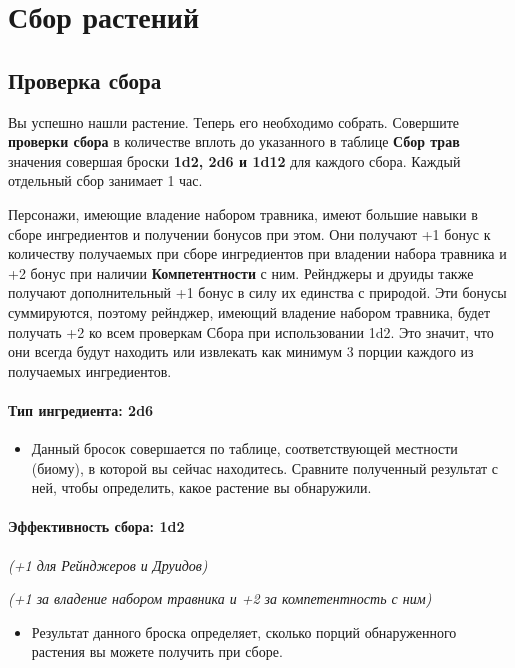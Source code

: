 \documentclass[a4paper, 9pt, twocolumn]{book}
\begin{document}
	\section{Сбор растений}
	
	\subsection{Проверка сбора}
	
	Вы успешно нашли растение. Теперь его необходимо собрать. Совершите \textbf{проверки сбора} в количестве вплоть до указанного в таблице \textbf{Сбор трав} значения совершая броски \textbf{1d2, 2d6 и 1d12} для каждого сбора. Каждый отдельный сбор занимает 1 час.
	
	Персонажи, имеющие владение набором травника, имеют большие навыки в сборе ингредиентов и получении бонусов при этом. Они получают +1 бонус к количеству получаемых при сборе ингредиентов при владении набора травника и +2 бонус при наличии \textbf{Компетентности} с ним. Рейнджеры и друиды также получают дополнительный +1 бонус в силу их единства с природой. Эти бонусы суммируются, поэтому рейнджер, имеющий владение набором травника, будет получать +2 ко всем проверкам Сбора при использовании 1d2. Это значит, что они всегда будут находить или извлекать как минимум 3 порции каждого из получаемых ингредиентов.
	
	\paragraph*{Тип ингредиента: 2d6}
	\noindent
	\begin{itemize}
		\item Данный бросок совершается по таблице, соответствующей местности (биому), в которой вы сейчас находитесь. Сравните полученный результат с ней, чтобы определить, какое растение вы обнаружили.
	\end{itemize}
	
	\paragraph*{Эффективность сбора: 1d2}
	
	\noindent\textit{(+1 для Рейнджеров и Друидов)}
	
	\noindent\textit{(+1 за владение набором травника и +2 за компетентность с ним)}
	\noindent
	\begin{itemize}
		\item Результат данного броска определяет, сколько порций обнаруженного растения вы можете получить при сборе. 
	\end{itemize}
\end{document}
